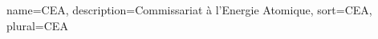 {%
	name={CEA}, %
	description={Commissariat à l'Energie Atomique}, %
	sort={CEA}, %
	plural={CEA} %
}